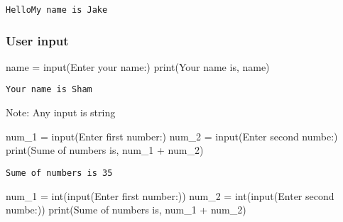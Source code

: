 \documentclass[
  letterpaper,
  DIV=11,
  numbers=noendperiod]{scrreprt}
\newenvironment{Shaded}{\begin{snugshade}}{\end{snugshade}}
\newcommand{\BuiltInTok}[1]{\textcolor[rgb]{0.00,0.46,0.62}{#1}}
\newcommand{\BuiltInTok}[1]{\textcolor[rgb]{0.00,0.48,0.65}{#1}}
\newcommand{\NormalTok}[1]{\textcolor[rgb]{0.00,0.46,0.62}{#1}}
\newcommand{\OperatorTok}[1]{\textcolor[rgb]{0.37,0.37,0.37}{#1}}
\newcommand{\NormalTok}[1]{\textcolor[rgb]{0.00,0.48,0.65}{#1}}
\newcommand{\OperatorTok}[1]{\textcolor[rgb]{0.37,0.37,0.37}{#1}}
\newcommand{\StringTok}[1]{\textcolor[rgb]{0.13,0.47,0.30}{#1}}
\begin{document}
\begin{Shaded}
\begin{Highlighting}[]
\begin{verbatim}
HelloMy name is Jake
\end{verbatim}

\hypertarget{user-input}{%
\subsubsection{User input}\label{user-input}}

\begin{Shaded}
\begin{Highlighting}[]
\NormalTok{name }\OperatorTok{=} \BuiltInTok{input}\NormalTok{(}\StringTok{\textquotesingle{}Enter your name:\textquotesingle{}}\NormalTok{)}
\BuiltInTok{print}\NormalTok{(}\StringTok{\textquotesingle{}Your name is\textquotesingle{}}\NormalTok{, name)}
\end{Highlighting}
\end{Shaded}

\begin{verbatim}
Your name is Sham
\end{verbatim}

Note: Any input is string

\begin{Shaded}
\begin{Highlighting}[]
\NormalTok{num\_1 }\OperatorTok{=} \BuiltInTok{input}\NormalTok{(}\StringTok{\textquotesingle{}Enter first number:\textquotesingle{}}\NormalTok{)}
\NormalTok{num\_2 }\OperatorTok{=} \BuiltInTok{input}\NormalTok{(}\StringTok{\textquotesingle{}Enter second numbe:\textquotesingle{}}\NormalTok{)}
\BuiltInTok{print}\NormalTok{(}\StringTok{\textquotesingle{}Sume of numbers is\textquotesingle{}}\NormalTok{, num\_1 }\OperatorTok{+}\NormalTok{ num\_2)}
\end{Highlighting}
\end{Shaded}

\begin{verbatim}
Sume of numbers is 35
\end{verbatim}

\begin{Shaded}
\begin{Highlighting}[]
\NormalTok{num\_1 }\OperatorTok{=} \BuiltInTok{int}\NormalTok{(}\BuiltInTok{input}\NormalTok{(}\StringTok{\textquotesingle{}Enter first number:\textquotesingle{}}\NormalTok{))}
\NormalTok{num\_2 }\OperatorTok{=} \BuiltInTok{int}\NormalTok{(}\BuiltInTok{input}\NormalTok{(}\StringTok{\textquotesingle{}Enter second numbe:\textquotesingle{}}\NormalTok{))}
\BuiltInTok{print}\NormalTok{(}\StringTok{\textquotesingle{}Sume of numbers is\textquotesingle{}}\NormalTok{, num\_1 }\OperatorTok{+}\NormalTok{ num\_2)}
\end{Highlighting}
\end{Shaded}


\end{Highlighting}
\end{Shaded}
\end{document}
